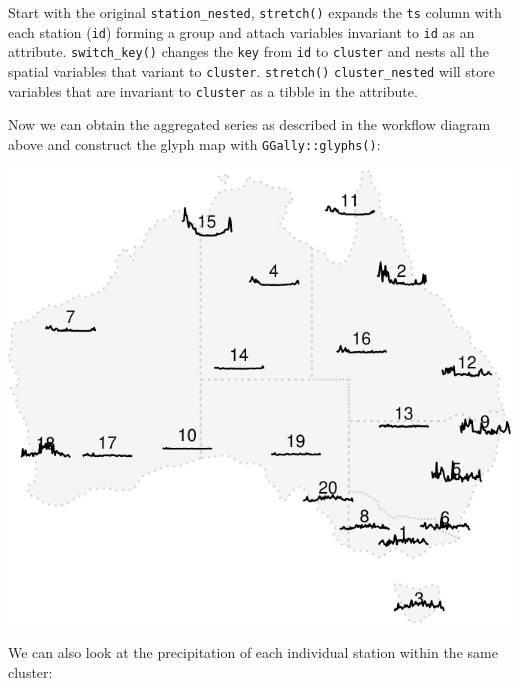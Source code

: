 \documentclass[
]{jss}
\begin{document}
Start with the original \texttt{station\_nested}, \texttt{stretch()}
expands the \texttt{ts} column with each station (\texttt{id}) forming a
group and attach variables invariant to \texttt{id} as an attribute.
\texttt{switch\_key()} changes the \texttt{key} from \texttt{id} to
\texttt{cluster} and nests all the spatial variables that variant to
\texttt{cluster}. \texttt{stretch()} \texttt{cluster\_nested} will store
variables that are invariant to \texttt{cluster} as a tibble in the
attribute.

Now we can obtain the aggregated series as described in the workflow
diagram above and construct the glyph map with
\texttt{GGally::glyphs()}:

\begin{CodeChunk}


\begin{center}\includegraphics{figures/unnamed-chunk-15-1} \end{center}

\end{CodeChunk}

We can also look at the precipitation of each individual station within
the same cluster:
\end{document}
